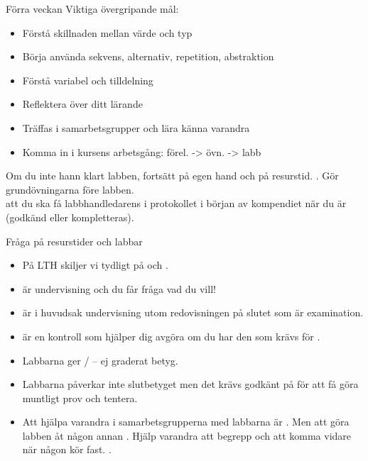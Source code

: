 

\begin{SlideExtra}{Förra veckan}
Viktiga övergripande mål:
\begin{itemize}
\item Förstå skillnaden mellan värde och typ
\item Börja använda sekvens, alternativ, repetition, abstraktion
\item Förstå variabel och tilldelning
\item Reflektera över ditt lärande
\item Träffas i samarbetsgrupper och lära känna varandra
\item Komma in i kursens arbetsgång: förel. -> övn. -> labb
\end{itemize}
Om du inte hann klart labben, fortsätt på egen hand och på resurstid. . Gör grundövningarna före labben.
\\ 
 att du ska få labbhandledarens  i protokollet i början av kompendiet när du är  (godkänd eller kompletteras).
\end{SlideExtra}

\begin{SlideExtra}{Fråga på resurstider och labbar}
\begin{itemize}
  \item På LTH skiljer vi tydligt på  och .
  \item {} är undervisning och du får fråga vad du vill!
  \item {} är i huvudsak undervisning utom redovisningen på slutet som är examination. 
  \item {} är en kontroll som hjälper dig avgöra om du har den  som krävs för .
  \item Labbarna ger / -- ej graderat betyg. 
  \item Labbarna påverkar inte slutbetyget men det krävs godkänt på   för att få göra muntligt prov och tentera.
  \item Att hjälpa varandra i samarbetsgrupperna med labbarna är . Men att göra labben åt någon annan . Hjälp varandra att  begrepp och att komma vidare när någon kör fast. .
\end{itemize}  
\end{SlideExtra}


